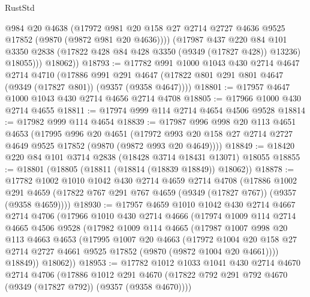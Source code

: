 \begin{lexlean}{RustStd}
\begin{coremodule}
{\begin{coremodule}
{{{{{{{{{{{{{{{{{{{{{{{{{{{{{{{{{{{{{{{              @984
              @20
              @4638
              (@17972
                @981
                @20
                @158
                @27
                @2714
                @2727
                @4636
                @9525
                @17852
                (@9870 (@9872 @981 @20 @4636))))
            (@17987
              @437
              @220
              @84
              @101
              @3350
              @2838
              (@17822 @428 @84 @428 @3350 (@9349 (@17827 @428)) @13236)
              @18055)))
        @18062))
@18793 := @17782
    @991
    @1000
    @1043
    @430
    @2714
    @4647
    @2714
    @4710
    (@17886
      @991
      @291
      @4647
      (@17822 @801 @291 @801 @4647 (@9349 (@17827 @801)) (@9357 (@9358 @4647))))
@18801 := @17957 @4647 @1000 @1043 @430 @2714 @4656 @2714 @4708
@18805 := @17966 @1000 @430 @2714 @4655
@18811 := @17974 @999 @114 @2714 @4654 @4506 @9528
@18814 := @17982 @999 @114 @4654
@18839 := @17987
    @996
    @998
    @20
    @113
    @4651
    @4653
    (@17995
      @996
      @20
      @4651
      (@17972 @993 @20 @158 @27 @2714 @2727 @4649 @9525 @17852 (@9870 (@9872 @993 @20 @4649))))
@18849 := @18420 @220 @84 @101 @3714 @2838 (@18428 @3714 @18431 @13071) @18055
@18855 := @18801 (@18805 (@18811 (@18814 (@18839 @18849)) @18062))
@18878 := @17782
    @1002
    @1010
    @1042
    @430
    @2714
    @4659
    @2714
    @4708
    (@17886
      @1002
      @291
      @4659
      (@17822 @767 @291 @767 @4659 (@9349 (@17827 @767)) (@9357 (@9358 @4659))))
@18930 := @17957
    @4659
    @1010
    @1042
    @430
    @2714
    @4667
    @2714
    @4706
    (@17966
      @1010
      @430
      @2714
      @4666
      (@17974
        @1009
        @114
        @2714
        @4665
        @4506
        @9528
        (@17982
          @1009
          @114
          @4665
          (@17987
            @1007
            @998
            @20
            @113
            @4663
            @4653
            (@17995
              @1007
              @20
              @4663
              (@17972
                @1004
                @20
                @158
                @27
                @2714
                @2727
                @4661
                @9525
                @17852
                (@9870 (@9872 @1004 @20 @4661))))
            @18849))
        @18062))
@18953 := @17782
    @1012
    @1033
    @1041
    @430
    @2714
    @4670
    @2714
    @4706
    (@17886
      @1012
      @291
      @4670
      (@17822 @792 @291 @792 @4670 (@9349 (@17827 @792)) (@9357 (@9358 @4670))))
}}}}}}}}}}}}}}}}}}}}}}}}}}}}}}}}}}}}}}}
\end{coremodule}}
\end{coremodule}
\end{lexlean}
